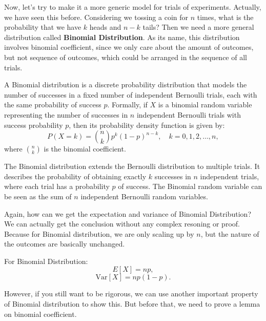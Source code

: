 Now, let's try to make it a more generic model for trials of experiments. Actually, we have seen this before. Considering we tossing a coin for $n$ times, what is the probability that we have $k$ heads and $n-k$ tails? Then we need a more general distribution called \textbf{Binomial Distribution}. As its name, this distribution involves binomial coefficient, since we only care about the amount of outcomes, but not sequence of outcomes, which could be arranged in the sequence of all trials.

\begin{definition}
    A Binomial distribution is a discrete probability distribution that models the number of successes in a fixed number of independent Bernoulli trials, each with the same probability of success \( p \). Formally, if \( X \) is a binomial random variable representing the number of successes in \( n \) independent Bernoulli trials with success probability \( p \), then its probability density function is given by:
    \[
    P(X = k) = \binom{n}{k} p^k (1-p)^{n-k}, \quad k = 0, 1, 2, \ldots, n,
    \]
    where \( \binom{n}{k} \) is the binomial coefficient.
\end{definition}

    The Binomial distribution extends the Bernoulli distribution to multiple trials. It describes the probability of obtaining exactly \( k \) successes in \( n \) independent trials, where each trial has a probability \( p \) of success. The Binomial random variable can be seen as the sum of \( n \) independent Bernoulli random variables.

    Again, how can we get the expectation and variance of Binomial Distribution? We can actually get the conclusion without any complex resoning or proof. Because for Binomial distribution, we are only scaling up by $n$, but the nature of the outcomes are basically unchanged.

\begin{theorem}
    For Binomial Distribution:
    \begin{equation}
    E[X] =  np,
\end{equation}
\begin{equation}
    \text{Var}[X] = np(1-p).
\end{equation}
\end{theorem}


However, if you still want to be rigorous, we can use another important property of Binomial distribution to show this. But before that, we need to prove a lemma on binomial coefficient.


